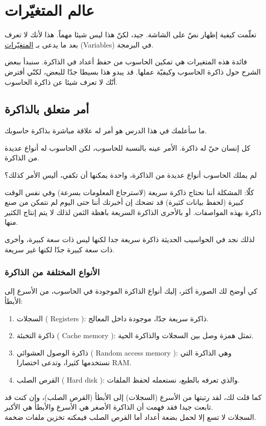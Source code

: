 \chapter{عالم المتغيّرات}

تعلّمت كيفية إظهار نصّ على الشاشة. جيد، لكنّ هذا ليس شيئا مهماً. هذا لأنك لا تعرف بعد ما يدعى بـ
\underline{المتغيّرات}
(\textenglish{Variables})
في البرمجة.

فائدة هذه المتغيرات هي تمكين الحاسوب من حفظ أعداد في الذاكرة. سنبدأ ببعض الشرح حول ذاكرة الحاسوب وكيفيّة عملها. قد يبدو هذا بسيطا جدّا للبعض، لكنّي أفترض أنّك لا تعرف شيئا عن ذاكرة الحاسوب.

\section{أمر متعلق بالذاكرة}
ما سأعلمك في هذا الدرس هو أمر له علاقة مباشرة بذاكرة حاسوبك.

كل إنسان حيّ له ذاكرة. الأمر عينه بالنسبة للحاسوب، لكن الحاسوب له أنواع عديدة من الذاكرة.

\begin{question}
  لم يملك الحاسوب أنواع عديدة من الذاكرة، واحدة يمكنها أن تكفي، أليس الأمر كذلك؟
\end{question}
كلّا: المشكلة أننا نحتاج ذاكرة سريعة (لاسترجاع المعلومات بسرعة) وفي نفس الوقت كبيرة (لحفظ بيانات كثيرة) قد تضحك إن أخبرتك أننا حتى اليوم لم نتمكن من صنع ذاكرة بهذه المواصفات. أو بالأحرى الذاكرة السريعة باهظة الثمن لذلك لا يتم إنتاج الكثير منها.

لذلك نجد في الحواسيب الحديثة ذاكرة سريعة جدا لكنها ليس ذات سعة كبيرة، وأخرى ذات سعة كبيرة جدّا لكنها غير سريعة.

\subsection{الأنواع المختلفة من الذاكرة}
كي أوضح لك الصورة أكثر، إليك أنواع الذاكرة الموجودة في الحاسوب، من الأسرع إلى الأبطأ:
\begin{enumerate}
  \item السجلات (
\textenglish{Registers}
): ذاكرة سريعة جدّا، موجودة داخل المعالج.
  \item ذاكرة التخبئة (
\textenglish{Cache memory}
): تمثل همزة وصل بين السجلات والذاكرة الحية.
  \item ذاكرة الوصول العشوائي (
\textenglish{Random access memory}
): وهي الذاكرة التي نستخدمها كثيرا، وتدعى اختصارا
\textenglish{RAM}.
  \item القرص الصلب (
\textenglish{Hard disk}
): والذي تعرفه بالطبع، نستعمله لحفظ الملفات.
\end{enumerate}
كما قلت لك، لقد رتبتها من الأسرع (السجلات) إلى الأبطأ (القرص الصلب)، وإن كنت قد تابعت جيدا فقد فهمت أن الذاكرة الأصغر هي الأسرع والأبطأ هي الأكبر.\\
السجلات لا تسع إلا لحمل بضعة أعداد أما القرص الصلب فيمكنه تخزين ملفات ضخمة.

